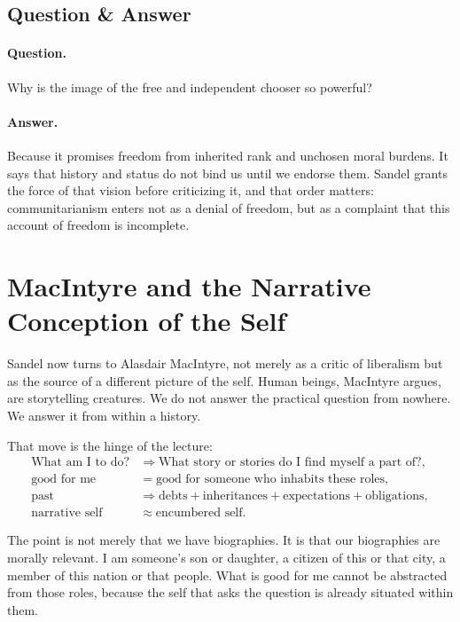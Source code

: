 \subsection{Question \& Answer}

\paragraph{Question.} Why is the image of the free and independent chooser so powerful?

\paragraph{Answer.} Because it promises freedom from inherited rank and unchosen moral burdens. It says that history and status do not bind us until we endorse them. Sandel grants the force of that vision before criticizing it, and that order matters: communitarianism enters not as a denial of freedom, but as a complaint that this account of freedom is incomplete.

\section{MacIntyre and the Narrative Conception of the Self}

Sandel now turns to Alasdair MacIntyre, not merely as a critic of liberalism but as the source of a different picture of the self. Human beings, MacIntyre argues, are storytelling creatures. We do not answer the practical question from nowhere. We answer it from within a history.

That move is the hinge of the lecture:
\begin{align}
\text{What am I to do?} &\Longrightarrow \text{What story or stories do I find myself a part of?}, \\
\text{good for me} &= \text{good for someone who inhabits these roles}, \\
\text{past} &\Longrightarrow \text{debts}+\text{inheritances}+\text{expectations}+\text{obligations}, \\
\text{narrative self} &\approx \text{encumbered self}.
\end{align}

The point is not merely that we have biographies. It is that our biographies are morally relevant. I am someone's son or daughter, a citizen of this or that city, a member of this nation or that people. What is good for me cannot be abstracted from those roles, because the self that asks the question is already situated within them.

